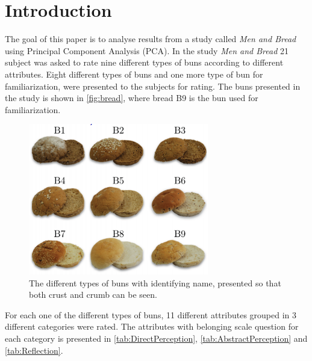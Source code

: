 \chapter*{Introduction}
\label{introduction}
%
The goal of this paper is to analyse results from a study called \textit{Men and Bread} using Principal Component Analysis (PCA). \blankline
% 
In the study \textit{Men and Bread} 21 subject was asked to rate nine different types of buns according to different attributes. Eight different types of buns and one more type of bun for familiarization, were presented to the subjects for rating. The buns presented in the study is shown in \autoref{fig:bread}, where bread B9 is the bun used for familiarization. 
%
\begin{figure}[H]
\centering
\includegraphics[width =0.7\textwidth]{Figure/Bread}
\caption{The different types of buns with identifying name, presented so that both crust and crumb can be seen.}
\label{fig:bread}
\end{figure}
\noindent
%
For each one of the different types of buns, 11 different attributes grouped in 3 different categories were rated. The attributes with belonging scale question for each category is presented in \autoref{tab:DirectPerception}, \autoref{tab:AbstractPerception} and \autoref{tab:Reflection}.

